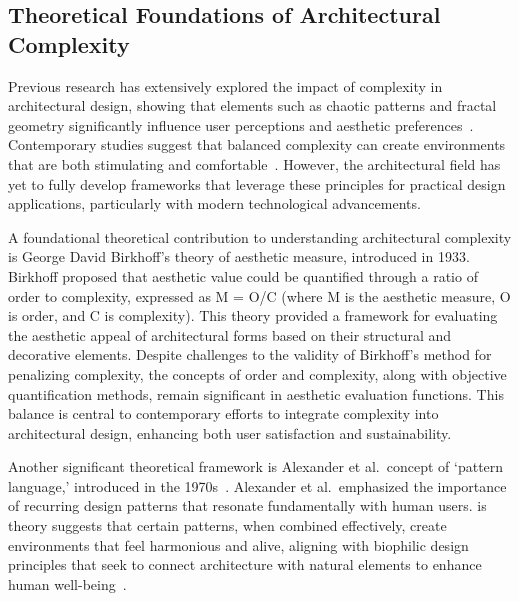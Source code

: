 \subsection{Theoretical Foundations of Architectural Complexity}
\label{subsec:ComplexityStudies}

Previous research has extensively explored the impact of complexity in architectural design, showing that elements such as chaotic patterns and fractal geometry significantly influence user perceptions and aesthetic preferences~\cite{Bies2016}.
Contemporary studies suggest that balanced complexity can create environments that are both stimulating and comfortable~\cite{Redies2015}.
However, the architectural field has yet to fully develop frameworks that leverage these principles for practical design applications, particularly with modern technological advancements.

A foundational theoretical contribution to understanding architectural complexity is George David Birkhoff's theory of aesthetic measure, introduced in 1933.
Birkhoff proposed that aesthetic value could be quantified through a ratio of order to complexity, expressed as M = O/C (where M is the aesthetic measure, O is order, and C is complexity)\cite{Douchova2016}.
This theory provided a framework for evaluating the aesthetic appeal of architectural forms based on their structural and decorative elements.
Despite challenges to the validity of Birkhoff's method for penalizing complexity, the concepts of order and complexity, along with objective quantification methods, remain significant in aesthetic evaluation functions\cite{Javaheri2016}.
This balance is central to contemporary efforts to integrate complexity into architectural design, enhancing both user satisfaction and sustainability.

Another significant theoretical framework is Alexander et al.~concept of `pattern language,' introduced in the 1970s~\cite{Alexander1977}.
Alexander et al.~emphasized the importance of recurring design patterns that resonate fundamentally with human users.
is theory suggests that certain patterns, when combined effectively, create environments that feel harmonious and alive, aligning with biophilic design principles that seek to connect architecture with natural elements to enhance human well-being~\cite{Downton2017}.

